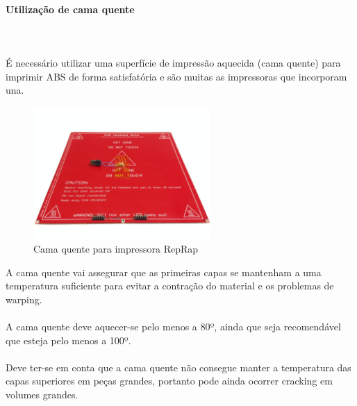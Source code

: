 \documentclass[11pt,a4paper]{article}
\begin{document}
			\paragraph{Utilização de cama quente}\mbox{}\\\\
É necessário utilizar uma superfície de impressão aquecida (cama quente) para imprimir ABS de forma satisfatória e são muitas as impressoras que incorporam una.
\begin{figure}[H]
\centering
\includegraphics[width=0.6\textwidth,cfbox=azul_marcos 4pt 0pt]{FOTOS/HEATEDBED}
\caption*{Cama quente para impressora RepRap}
\end{figure}
A cama quente vai assegurar que as primeiras capas se mantenham a uma temperatura suficiente para evitar a contração do material e os problemas de warping.
\\\\
A cama quente deve aquecer-se pelo menos a 80º, ainda que seja recomendável que esteja pelo menos a 100º.
\\\\
Deve ter-se em conta que a cama quente não consegue manter a temperatura das capas superiores em peças grandes, portanto pode ainda ocorrer cracking em volumes grandes.
\end{document}
